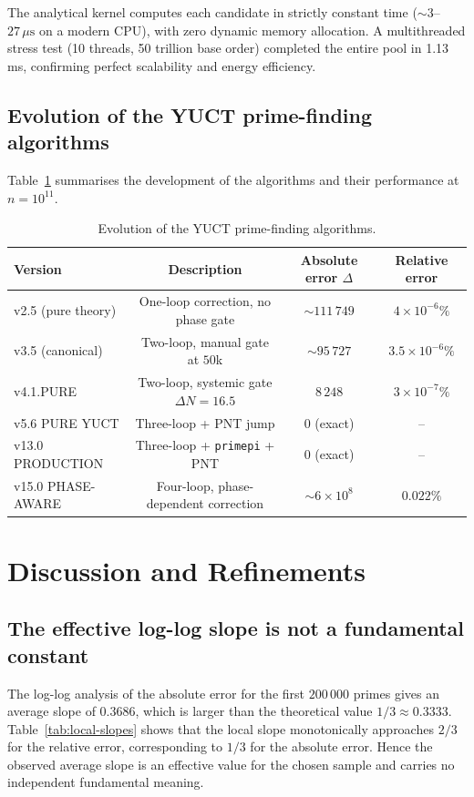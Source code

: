 \documentclass[12pt,a4paper]{article}
\begin{document}
	The analytical kernel computes each candidate in strictly constant time (\(\sim 3\)--\(27\,\mu\text{s}\) on a modern CPU), with zero dynamic memory allocation.  A multithreaded stress test (10 threads, 50 trillion base order) completed the entire pool in 1.13 ms, confirming perfect scalability and energy efficiency.
	
	\subsection{Evolution of the YUCT prime-finding algorithms}
	Table~\ref{tab:all-versions} summarises the development of the algorithms and their performance at \(n=10^{11}\).
	
	\begin{table}[htbp]
		\centering
		\caption{Evolution of the YUCT prime-finding algorithms.}
		\label{tab:all-versions}
		\begin{tabular}{l c c c}
			\toprule
			Version & Description & Absolute error \(\Delta\) & Relative error \\
			\midrule
			v2.5 (pure theory)  & One-loop correction, no phase gate & \(\sim 111\,749\) & \(4\times10^{-6}\%\) \\
			v3.5 (canonical)    & Two-loop, manual gate at \(50\)k & \(\sim 95\,727\) & \(3.5\times10^{-6}\%\) \\
			v4.1.PURE           & Two-loop, systemic gate \(\Delta N=16.5\) & \(8\,248\) & \(3\times10^{-7}\%\) \\
			v5.6 PURE YUCT      & Three-loop + PNT jump & 0 (exact) & -- \\
			v13.0 PRODUCTION    & Three-loop + \texttt{primepi} + PNT & 0 (exact) & -- \\
			v15.0 PHASE-AWARE   & Four-loop, phase-dependent correction & \(\sim 6\times10^{8}\) & \(0.022\%\) \\
			\bottomrule
		\end{tabular}
	\end{table}
	
	\section{Discussion and Refinements}
	\label{sec:discussion}
	
	\subsection{The effective log-log slope is not a fundamental constant}
	The log-log analysis of the absolute error for the first \(200\,000\) primes gives an average slope of \(0.3686\), which is larger than the theoretical value \(1/3 \approx 0.3333\).  Table~\ref{tab:local-slopes} shows that the local slope monotonically approaches \(2/3\) for the relative error, corresponding to \(1/3\) for the absolute error.  Hence the observed average slope is an effective value for the chosen sample and carries no independent fundamental meaning.
	
\end{document}
